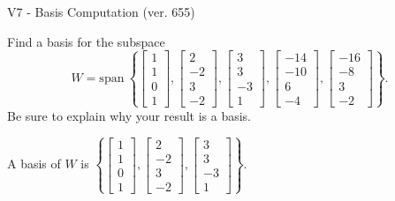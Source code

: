 \begin{exercise}
  \begin{exerciseTitle}V7 - Basis Computation (ver. 655)\end{exerciseTitle}
  \begin{exerciseStatement}
    Find a basis for the subspace 
\[W=\mathrm{span}\ \left\{\left[\begin{array}{r}
1 \\
1 \\
0 \\
1
\end{array}\right] , \left[\begin{array}{r}
2 \\
-2 \\
3 \\
-2
\end{array}\right] , \left[\begin{array}{r}
3 \\
3 \\
-3 \\
1
\end{array}\right] , \left[\begin{array}{r}
-14 \\
-10 \\
6 \\
-4
\end{array}\right] , \left[\begin{array}{r}
-16 \\
-8 \\
3 \\
-2
\end{array}\right]\right\}.\]
 Be sure to explain why your result is a basis.


  \end{exerciseStatement}
  \begin{exerciseAnswer}
   A basis of \(W\) is  \(\left\{\left[\begin{array}{r}
1 \\
1 \\
0 \\
1
\end{array}\right] , \left[\begin{array}{r}
2 \\
-2 \\
3 \\
-2
\end{array}\right] , \left[\begin{array}{r}
3 \\
3 \\
-3 \\
1
\end{array}\right]\right\}\).
  


  \end{exerciseAnswer}
\end{exercise}